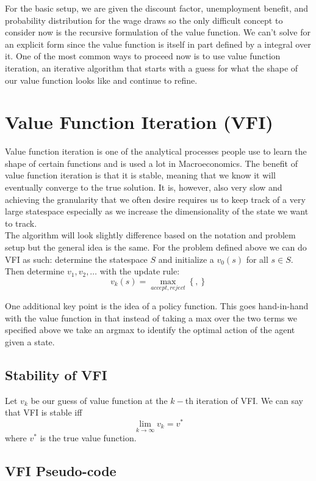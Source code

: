 \documentclass[11pt,english]{article}
\begin{document}
\noindent For the basic setup, we are given the discount factor, unemployment benefit, and probability distribution for the wage draws so the only difficult concept to consider now is the recursive formulation of the value function. We can't solve for an explicit form since the value function is itself in part defined by a integral over it. One of the most common ways to proceed now is to use value function iteration, an iterative algorithm that starts with a guess for what the shape of our value function looks like and continue to refine.

\section{Value Function Iteration (VFI)}

Value function iteration is one of the analytical processes people use to learn the shape of certain functions and is used a lot in Macroeconomics. The benefit of value function iteration is that it is stable, meaning that we know it will eventually converge to the true solution. It is, however, also very slow and achieving the granularity that we often desire requires us to keep track of a very large statespace especially as we increase the dimensionality of the state we want to track.\\

\noindent The algorithm will look slightly difference based on the notation and problem setup but the general idea is the same. For the problem defined above we can do VFI as such: determine the statespace $S$ and initialize a $v_0(s)$ for all $s\in S$. Then determine $v_1, v_2, \ldots$ with the update rule: $$v_k(s) = \max_{accept, reject}\left\{,\right\}$$

\noindent One additional key point is the idea of a policy function. This goes hand-in-hand with the value function in that instead of taking a max over the two terms we specified above we take an argmax to identify the optimal action of the agent given a state.
\subsection{Stability of VFI}

Let $v_k$ be our guess of value function at the $k-$th iteration of VFI. We can say that VFI is stable iff $$\lim_{k\to \infty}v_k = v^*$$ where $v^*$ is the true value function.



\subsection{VFI Pseudo-code}
\end{document}
